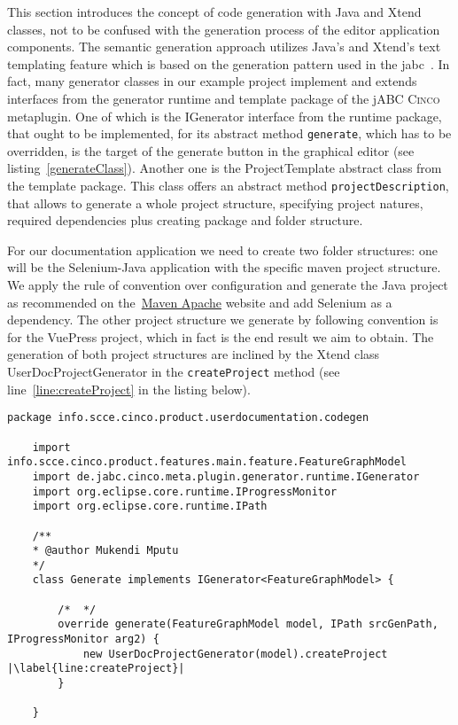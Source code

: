 This section introduces the concept of code generation with Java and Xtend classes, not to be confused with the generation process of the editor application components. The semantic generation approach utilizes Java's and Xtend's text templating feature which is based on the generation pattern used in the \acrfull{jabc}~\cite{model-driver-dev_jABC,jabc-home}. In fact, many generator classes in our example project implement and extends interfaces from the generator runtime and template package of the jABC \textsc{Cinco} metaplugin. One of which is the IGenerator interface from the runtime package, that ought to be implemented, for its abstract method \lstinline{generate}, which has to be overridden, is the target of the generate button in the graphical editor (see listing~\ref{generateClass}). Another one is the ProjectTemplate abstract class from the template package. This class offers an abstract method \lstinline{projectDescription}, that allows to generate a whole project structure, specifying project natures, required dependencies plus creating package and folder structure.

For our documentation application we need to create two folder structures: one will be the Selenium-Java application with the specific maven project structure. We apply the rule of convention over configuration and generate the Java project as recommended on the~\href{https://www.apache.org/}{Maven Apache} website and add Selenium as a dependency. The other project structure we generate by following convention is for the VuePress project, which in fact is the end result we aim to obtain. The generation of both project structures are inclined by the Xtend class UserDocProjectGenerator in the \lstinline[language=MGL]{createProject} method (see line~\ref{line:createProject} in the listing below).

\begin{lstlisting}[language=MGL, caption={Generate.xtend clas implementing the IGenerator infterface}, label=generateClass, escapechar=|]
    package info.scce.cinco.product.userdocumentation.codegen

    import info.scce.cinco.product.features.main.feature.FeatureGraphModel
    import de.jabc.cinco.meta.plugin.generator.runtime.IGenerator
    import org.eclipse.core.runtime.IProgressMonitor
    import org.eclipse.core.runtime.IPath

    /**
    * @author Mukendi Mputu
    */
    class Generate implements IGenerator<FeatureGraphModel> {

        /*	*/
        override generate(FeatureGraphModel model, IPath srcGenPath, IProgressMonitor arg2) {
            new UserDocProjectGenerator(model).createProject |\label{line:createProject}|
        }
        
    }
\end{lstlisting}

